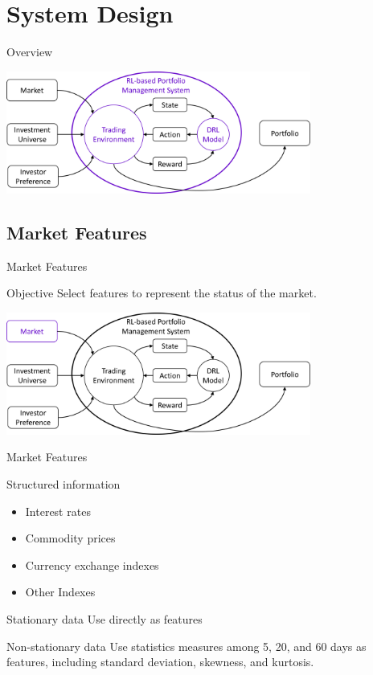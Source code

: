 \section{System Design}
\begin{frame}{Overview}
   \tableofcontents[sectionstyle=show/hide, hideothersubsections]
\begin{center}
  \includegraphics[width=10cm]{images/context_diagram.png} 
\end{center}
\end{frame}


\subsection{Market Features}
\begin{frame}{Market Features}
    \begin{block}{Objective}
        Select features to represent the status of the market.
    \end{block}
\centering
\includegraphics[width=10cm]{images/market.png}

\end{frame}

\begin{frame}{Market Features}
\begin{block}{Structured information}
\begin{itemize}
    \item Interest rates
    \item Commodity prices
    \item Currency exchange indexes
    \item Other Indexes
\end{itemize}
\end{block}
\begin{block}{Stationary data}
   Use directly as features
\end{block}
\begin{block}{Non-stationary data}
    Use statistics measures among 5, 20, and 60 days as features, including standard deviation, skewness, and kurtosis.
\end{block}
\end{frame}

